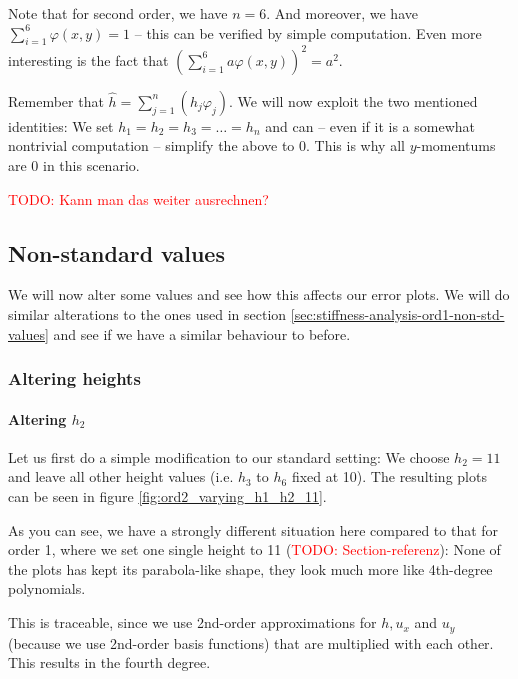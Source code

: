 \documentclass{article}
\newcommand{\todo}[1]{\textcolor{red}{TODO: #1}}
\renewcommand{\phi}{\varphi}
\begin{document}
Note that for second order, we have $n=6$. And moreover, we have $\sum_{i=1}^6 \phi(x,y)=1$ -- this can be verified by simple computation. Even more interesting is the fact that $(\sum_{i=1}^6 a \phi(x,y))^2 = a^2$.

Remember that $\widehat{h}=\sum_{j=1}^n \left(h_j \phi_j\right)$. We will now exploit the two mentioned identities: We set $h_1=h_2=h_3=\dots=h_n$ and can -- even if it is a somewhat nontrivial computation -- simplify the above to 0. This is why all $y$-momentums are 0 in this scenario.

\todo{Kann man das weiter ausrechnen?}

\subsection{Non-standard values}
\label{sec:stiffness-analysis-ord2-nondefault}

We will now alter some values and see how this affects our error plots. We will do similar alterations to the ones used in section \ref{sec:stiffness-analysis-ord1-non-std-values} and see if we have a similar behaviour to before.

\subsubsection{Altering heights}
\label{sec:stiffness-analysis-ord2-nondefault-altering-heights}

\paragraph{Altering $h_2$}

Let us first do a simple modification to our standard setting: We choose $h_2=11$ and leave all other height values (i.e. $h_3$ to $h_6$ fixed at 10). The resulting plots can be seen in figure \ref{fig:ord2_varying_h1_h2_11}. 



As you can see, we have a strongly different situation here compared to that for order 1, where we set one single height to 11 (\todo{Section-referenz}): None of the plots has kept its parabola-like shape, they look much more like 4th-degree polynomials.

This is traceable, since we use 2nd-order approximations for $h, u_x$ and $u_y$ (because we use 2nd-order basis functions) that are multiplied with each other. This results in the fourth degree.
\end{document}

